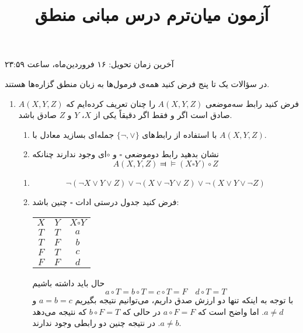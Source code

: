 \documentclass[12pt, 14paper]{article}
\title{آزمون میان‌ترم درس مبانی منطق}
\author{}
\date{}
\begin{document}
\maketitle

\vspace{-2.5cm}

\begin{center}آخرین زمان تحویل: ۱۶ فروردین‌ماه، ساعت ۲۳:۵۹\end{center}

\vspace{0.5cm}

در سؤالات یک تا پنج فرض کنید همه‌ی فرمول‌ها به زبان منطق گزاره‌ها هستند.

\begin{enumerate}

\item
فرض کنید رابط سه‌موضعی $A(X,Y,Z)$ را چنان تعریف کرده‌ایم که $A(X,Y,Z)$ صادق است اگر و فقط اگر دقیقاً یکی از $X$، $Y$ و $Z$ صادق باشد.

\begin{enumerate}
\item
با استفاده از رابط‌های
$\{\neg,\vee\}$
جمله‌ای بسازید معادل با
$A(X,Y,Z)$.
\item
نشان بدهید رابط دوموضعی $\square$ و $\circ$ای وجود ندارند چنانکه
$$
A(X,Y,Z)\Dashv\vDash(X\square Y)\circ Z
$$
\end{enumerate}

\begin{ans}
\begin{enumerate}
\item
$$
\neg(\neg X\vee Y\vee Z)\vee\neg(X\vee\neg Y\vee Z)\vee\neg(X\vee Y\vee\neg Z)
$$
\item
فرض کنید جدول درستی ادات
$\square$
چنین باشد:

\begin{tabular}{c|c|c}
$X$ & $Y$ & $X\square Y$ \\
$T$ & $T$ & $a$ \\
$T$ & $F$ & $b$ \\
$F$ & $T$ & $c$ \\
$F$ & $F$ & $d$ \\
\end{tabular}

حال باید داشته باشیم
$$
a\circ T = b\circ T = c\circ T = F \quad d\circ T = T
$$
با توجه به اینکه تنها دو ارزش صدق داریم، می‌توانیم نتیجه بگیریم
$a=b=c$
و
$a\neq d$.
اما واضح است که
$a\circ F=F$
در حالی که
$b\circ F=T$
که نتیجه می‌دهد
$a\neq b$.
در نتیجه چنین دو رابطی وجود ندارند.


\end{enumerate}
\end{ans}
\end{enumerate}
\end{document}
